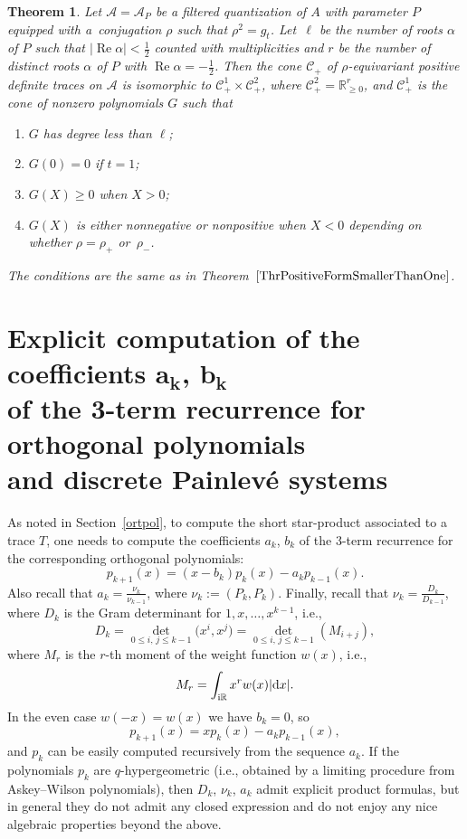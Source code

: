 \documentclass[10pt,a4paper]{amsart}
\newcommand{\RN}{\mathbb{R}} %
\newcommand{\mc}[1]{\mathcal{#1}}
\renewcommand{\Re}{\operatorname{Re}}
\newtheorem{Theorem}{Theorem}[section]
\theoremstyle{definition}
\numberwithin{equation}{section}
\begin{document}
\begin{Theorem}
Let $\mc{A}=\mc A_P$ be a filtered quantization of $A$ with parameter $P$ equipped with a~con\-jugation $\rho$ such that $\rho^2=g_t$. Let~$\ell$ be the number of roots $\alpha$ of $P$ such that $|\Re\alpha|<\frac{1}{2}$ counted with multiplicities and $r$ be the number of distinct roots $\alpha$ of $P$ with $\Re\alpha=-\frac{1}{2}$. Then the cone $\mc C_+$ of $\rho$-equivariant positive definite traces on $\mc{A}$ is isomorphic to $\mc C_+^1\times \mc C_+^2$, where $\mc C_+^2=\RN_{\geq 0}^r$, and $\mc C_+^1$ is the cone of nonzero polynomials $G$ such that
\begin{enumerate}\itemsep=0pt
\item[$(1)$]
$G$ has degree less than $\ell$;
\item[$(2)$]
$G(0)=0$ if $t=1$;
\item[$(3)$]
$G(X)\geq 0$ when $X>0$;
\item[$(4)$]
$G(X)$ is either nonnegative or nonpositive when $X<0$ depending on whether
$\rho=\rho_+$ or~$\rho_-$.
\end{enumerate}
The conditions are the same as in Theorem~$\ref{ThrPositiveFormSmallerThanOne}$.
\end{Theorem}


\section[Explicit computation of the coefficients ak, bk of the 3-term recurrence for orthogonal polynomials and discrete Painleve systems]
{Explicit computation of the coefficients $\boldsymbol{a_k}$, $\boldsymbol{b_k}$ \\of the 3-term recurrence for orthogonal polynomials \\and discrete Painlev\'e systems}
\label{expcom}

As noted in Section~\ref{ortpol}, to compute
the short star-product associated to a trace $T$,
one needs to compute the coefficients $a_k$, $b_k$ of the 3-term recurrence for the corresponding orthogonal polynomials:
\[
p_{k+1}(x)=(x-b_k)p_k(x)-a_kp_{k-1}(x).
\]
Also recall \cite{Sz} that
$a_k=\frac{\nu_k}{\nu_{k-1}}$, where $\nu_k:=(P_k,P_k)$. Finally, recall that
$\nu_k=\frac{D_k}{D_{k-1}}$, where
$D_k$ is the Gram determinant for $1,x,\dots,x^{k-1}$, i.e.,
\[
D_k=\det_{0\le i,\,j\le k-1}\big(x^i,x^j\big)=\det_{0\le i,\,j\le k-1}(M_{i+j}),
\]
where $M_r$ is the $r$-th moment of the weight function $w(x)$, i.e.,
\[
M_r=\int_{{\rm i}\mathbb R}x^rw(x)|{\rm d}x|.
\]
In the even case $w(-x)=w(x)$ we have $b_k=0$, so
\[
p_{k+1}(x)=xp_k(x)-a_kp_{k-1}(x),
\]
and $p_k$ can be easily computed recursively from the sequence $a_k$.
If the polynomials $p_k$ are $q$-hypergeometric (i.e., obtained by a limiting procedure from Askey--Wilson polynomials), then $D_k$, $\nu_k$, $a_k$ admit explicit product formulas, but in general they do not admit any closed expression and do not enjoy any nice algebraic properties beyond the above.
\end{document}
